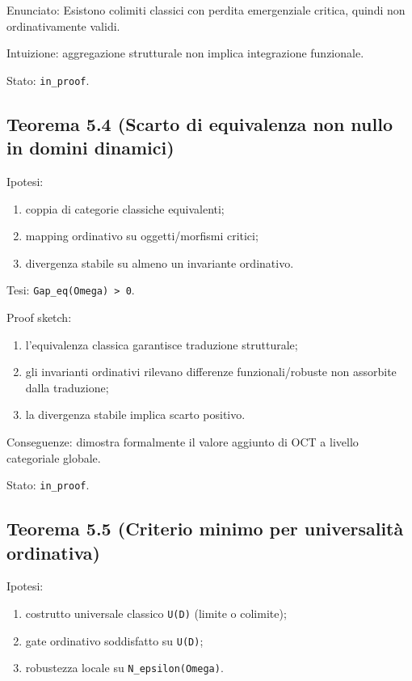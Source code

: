 Enunciato:
Esistono colimiti classici con perdita emergenziale critica, quindi non ordinativamente validi.

Intuizione:
aggregazione strutturale non implica integrazione funzionale.

Stato: \texttt{in\_proof}.

\subsection{Teorema 5.4 (Scarto di equivalenza non nullo in domini dinamici)}

Ipotesi:

\begin{enumerate}
\def\labelenumi{\arabic{enumi}.}
\tightlist
\item
  coppia di categorie classiche equivalenti;
\item
  mapping ordinativo su oggetti/morfismi critici;
\item
  divergenza stabile su almeno un invariante ordinativo.
\end{enumerate}

Tesi:
\texttt{Gap\_eq(Omega)\ \textgreater{}\ 0}.

Proof sketch:

\begin{enumerate}
\def\labelenumi{\arabic{enumi}.}
\tightlist
\item
  l'equivalenza classica garantisce traduzione strutturale;
\item
  gli invarianti ordinativi rilevano differenze funzionali/robuste non assorbite dalla traduzione;
\item
  la divergenza stabile implica scarto positivo.
\end{enumerate}

Conseguenze:
dimostra formalmente il valore aggiunto di OCT a livello categoriale globale.

Stato: \texttt{in\_proof}.

\subsection{Teorema 5.5 (Criterio minimo per universalità ordinativa)}

Ipotesi:

\begin{enumerate}
\def\labelenumi{\arabic{enumi}.}
\tightlist
\item
  costrutto universale classico \texttt{U(D)} (limite o colimite);
\item
  gate ordinativo soddisfatto su \texttt{U(D)};
\item
  robustezza locale su \texttt{N\_epsilon(Omega)}.
\end{enumerate}

